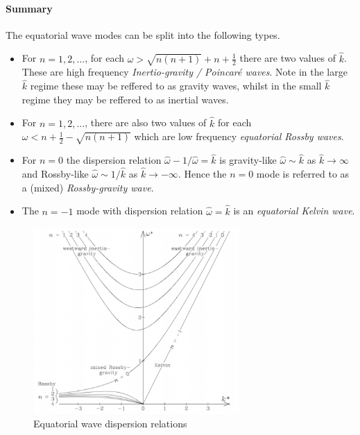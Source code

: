 \documentclass{jknotes}
\begin{document}
\paragraph{Summary}
The equatorial wave modes can be split into the following types.
\begin{itemize}
	\item For $n = 1, 2, \dots$, for each $\omega > \sqrt{n(n+1)} + n +
		\frac{1}{2}$ there are two values of $\hat{k}$. These are high
		frequency \emph{Inertio-gravity / Poincar\'{e} waves}. Note in the
		large $\hat{k}$ regime these may be reffered to as gravity waves,
		whilst in the small $\hat{k}$ regime they may be reffered to as
		inertial waves.
	\item For $n = 1, 2, \dots$, there are also two values of $\hat{k}$ for
		each $\omega < n + \frac{1}{2} - \sqrt{n(n+1)}$ which are low
		frequency \emph{equatorial Rossby waves}.
	\item For $n = 0$ the dispersion relation $\hat{\omega} - 1/\hat{\omega} =
		\hat{k}$ is gravity-like $\hat{\omega} \sim \hat{k}$ as
		$\hat{k} \to \infty$ and Rossby-like $\hat{\omega} \sim 1/\hat{k}$ as
		$\hat{k} \to -\infty$. Hence the $n=0$ mode is referred to as a
		(mixed) \emph{Rossby-gravity wave}.
	\item The $n=-1$ mode with dispersion relation $\hat{\omega} = \hat{k}$ is
		an \emph{equatorial Kelvin wave}.
\end{itemize}

\begin{figure}
	\centering
	\includegraphics[width=0.7\textwidth]{equatorial.png}
	\caption{Equatorial wave dispersion relations}
\end{figure}
\end{document}
